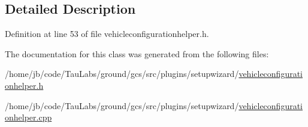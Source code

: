 \subsection{\-Detailed \-Description}


\-Definition at line 53 of file vehicleconfigurationhelper.\-h.



\-The documentation for this class was generated from the following files\-:\begin{DoxyCompactItemize}
\item 
/home/jb/code/\-Tau\-Labs/ground/gcs/src/plugins/setupwizard/\hyperlink{vehicleconfigurationhelper_8h}{vehicleconfigurationhelper.\-h}\item 
/home/jb/code/\-Tau\-Labs/ground/gcs/src/plugins/setupwizard/\hyperlink{vehicleconfigurationhelper_8cpp}{vehicleconfigurationhelper.\-cpp}\end{DoxyCompactItemize}
